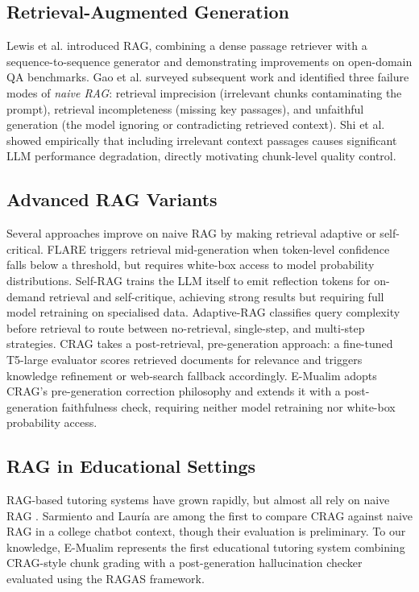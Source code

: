 \documentclass[conference]{IEEEtran}
\begin{document}
\subsection{Retrieval-Augmented Generation}

Lewis et al. \cite{lewis2020rag} introduced RAG, combining a dense
passage retriever with a sequence-to-sequence generator and
demonstrating improvements on open-domain QA benchmarks.
Gao et al. \cite{gao2024ragsurvey} surveyed subsequent work and
identified three failure modes of \emph{naive RAG}: retrieval
imprecision (irrelevant chunks contaminating the prompt), retrieval
incompleteness (missing key passages), and unfaithful generation
(the model ignoring or contradicting retrieved context).
Shi et al. \cite{shi2023distracted} showed empirically that including
irrelevant context passages causes significant LLM performance
degradation, directly motivating chunk-level quality control.

\subsection{Advanced RAG Variants}

Several approaches improve on naive RAG by making retrieval adaptive
or self-critical.
FLARE \cite{jiang2023flare} triggers retrieval mid-generation when
token-level confidence falls below a threshold, but requires
white-box access to model probability distributions.
Self-RAG \cite{asai2024selfrag} trains the LLM itself to emit
reflection tokens for on-demand retrieval and self-critique, achieving
strong results but requiring full model retraining on specialised data.
Adaptive-RAG \cite{jeong2024adaptiverag} classifies query complexity
before retrieval to route between no-retrieval, single-step, and
multi-step strategies.
CRAG \cite{yan2024crag} takes a post-retrieval, pre-generation
approach: a fine-tuned T5-large evaluator scores retrieved documents
for relevance and triggers knowledge refinement or web-search fallback
accordingly.
E-Mualim adopts CRAG's pre-generation correction philosophy and
extends it with a post-generation faithfulness check, requiring
neither model retraining nor white-box probability access.

\subsection{RAG in Educational Settings}

RAG-based tutoring systems have grown rapidly, but almost all rely
on naive RAG \cite{sarmiento2025crag}.
Sarmiento and Laur{\'i}a \cite{sarmiento2025crag} are among the
first to compare CRAG against naive RAG in a college chatbot context,
though their evaluation is preliminary.
To our knowledge, E-Mualim represents the first educational tutoring
system combining CRAG-style chunk grading with a post-generation
hallucination checker evaluated using the RAGAS framework.
\end{document}
